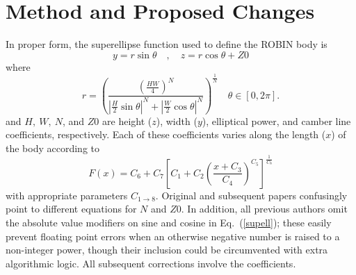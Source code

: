 \documentclass[journal]{new-aiaa}
\begin{document}

\section{Method and Proposed Changes}
In proper form, the superellipse function used to define the ROBIN body is
\begin{equation}
   y=r \sin \theta \quad , \quad z=r \cos \theta +Z0
\end{equation} 
where
\begin{equation}
  r=\left(\frac{\left(\frac{HW}{4}\right)^{N}}{|\frac{H}{2}\sin \theta|^{N}+|\frac{W}{2}\cos \theta|^{N}}\right)^{\frac{1}{N}} \quad \theta\in[0,2\pi].
\label{supell}
\end{equation}
and $H, \ W, \ N$, and $Z0$ are height ($z$), width ($y$), elliptical power, and camber line coefficients,
respectively.
Each of these coefficients varies along the length ($x$) of the body according to
\begin{equation}
  F\!\left(x\right) = C_{6}+C_{7}\left[C_{1}+C_{2}\left(\frac{x+C_{3}}{C_{4}}\right)^{C_{5}}\right]^{\frac{1}{C_{8}}}
\label{coeff}
\end{equation}
with appropriate parameters $C_{1 \to 8}$.
Original \cite{nasa80051} and subsequent \cite{nasa87762} papers confusingly point to different equations
for $N$ and $Z0$.
In addition, all previous authors omit the absolute value modifiers on sine and cosine in Eq.~(\ref{supell});
these easily prevent floating point errors when an otherwise negative number is raised to a non-integer power,
though their inclusion could be circumvented with extra algorithmic logic.  
All subsequent corrections involve the coefficients.
\end{document}
